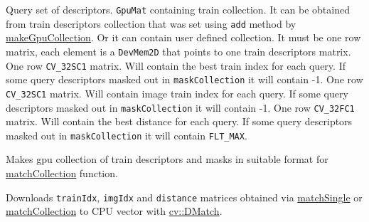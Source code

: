 
\begin{description}
 {Query set of descriptors.}
 {\texttt{GpuMat} containing train collection. It can be obtained from train descriptors collection that was set using \texttt{add} method by \hyperref[cppfunc.gpu.BruteForceMatcher.makeGpuCollection]{makeGpuCollection}. Or it can contain user defined collection. It must be one row matrix, each element is a \texttt{DevMem2D} that points to one train descriptors matrix.}
 {One row \texttt{CV\_32SC1} matrix. Will contain the best train index for each query. If some query descriptors masked out in \texttt{maskCollection} it will contain -1.}
 {One row \texttt{CV\_32SC1} matrix. Will contain image train index for each query. If some query descriptors masked out in \texttt{maskCollection} it will contain -1.}
 {One row \texttt{CV\_32FC1} matrix. Will contain the best distance for each query. If some query descriptors masked out in \texttt{maskCollection} it will contain \texttt{FLT\_MAX}.}
\end{description}


\label{cppfunc.gpu.BruteForceMatcher.makeGpuCollection}
Makes gpu collection of train descriptors and masks in suitable format for \hyperref[cppfunc.gpu.BruteForceMatcher.matchCollection]{matchCollection} function.



\label{cppfunc.gpu.BruteForceMatcher.matchDownload}
Downloads \texttt{trainIdx}, \texttt{imgIdx} and \texttt{distance} matrices obtained via \hyperref[cppfunc.gpu.BruteForceMatcher.matchSingle]{matchSingle} or \hyperref[cppfunc.gpu.BruteForceMatcher.matchCollection]{matchCollection} to CPU vector with \hyperref[cv.class.DMatch]{cv::DMatch}.

